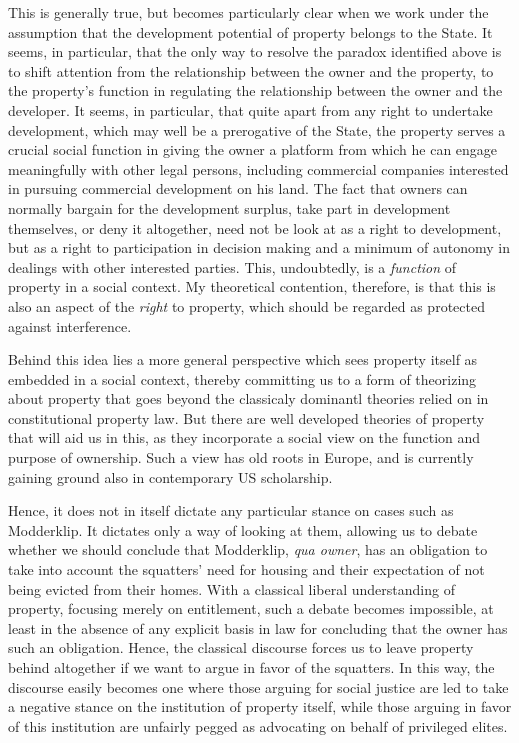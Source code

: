This is generally true, but becomes particularly clear when we work under the assumption that the development potential of property belongs to the State. It seems, in particular, that the only way to resolve the paradox identified above is to shift attention from the relationship between the owner and the property, to the property's function in regulating the relationship between the owner and the developer. It seems, in particular, that quite apart from any right to undertake development, which may well be a prerogative of the State, the property serves a crucial social function in giving the owner a platform from which he can engage meaningfully with other legal persons, including commercial companies interested in pursuing commercial development on his land. The fact that owners can normally bargain for the development surplus, take part in development themselves, or deny it altogether, need not be look at as a right to development, but as a right to participation in decision making and a minimum of autonomy in dealings with other interested parties. This, undoubtedly, is a {\it function} of property in a social context. My theoretical contention, therefore, is that this is also an aspect of the {\it right} to property, which should be regarded as protected against interference. 

Behind this idea lies a more general perspective which sees property itself as embedded in a social context, thereby committing us to a form of theorizing about property that goes beyond the classicaly dominantl theories relied on in constitutional property law. But there are well developed theories of property that will aid us in this, as they incorporate a social view on the function and purpose of ownership. Such a view has old roots in Europe, and is currently gaining ground also in contemporary US scholarship. 

Hence, it does not in itself dictate any particular stance on cases such as Modderklip. It dictates only a way of looking at them, allowing us to debate whether we should conclude that Modderklip, {\it qua owner}, has an obligation to take into account the squatters' need for housing and their expectation of not being evicted from their homes. With a classical liberal understanding of property, focusing merely on entitlement, such a debate becomes impossible, at least in the absence of any explicit basis in law for concluding that the owner has such an obligation. Hence, the classical discourse forces us to leave property behind altogether if we want to argue in favor of the squatters. In this way, the discourse easily becomes one where those arguing for social justice are led to take a negative stance on the institution of property itself, while those arguing in favor of this institution are unfairly pegged as advocating on behalf of privileged elites.


